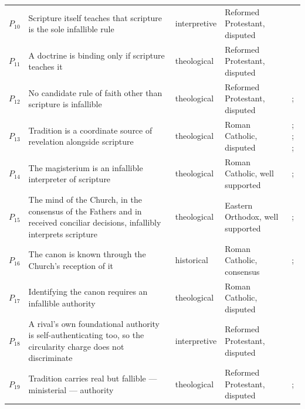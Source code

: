 \documentclass[11pt]{article}
\begin{document}
\begin{longtable}{@{}r >{\raggedright\arraybackslash}p{} l >{\raggedright\arraybackslash}p{} >{\raggedright\arraybackslash}p{}@{}}
$P_{10}$ & Scripture itself teaches that scripture is the sole infallible rule & interpretive & Reformed Protestant, disputed & \cite[I.vii.4]{calvin-institutes-1960} \\
$P_{11}$ & A doctrine is binding only if scripture teaches it & theological & Reformed Protestant, disputed & \cite[IV.x.8]{calvin-institutes-1960} \\
$P_{12}$ & No candidate rule of faith other than scripture is infallible & theological & Reformed Protestant, disputed & \cite[I.6]{westminster-confession-1647}; \cite{mathison-shape-sola-scriptura-2001} \\
$P_{13}$ & Tradition is a coordinate source of revelation alongside scripture & theological & Roman Catholic, disputed & \cite[Trent, Session IV (1546), Decree on Sacred Books and Traditions]{tanner-decrees-1990}; \cite{mathison-shape-sola-scriptura-2001}; \cite{geiselmann-meaning-of-tradition-1966}; \cite{congar-tradition-and-traditions-1966} \\
$P_{14}$ & The magisterium is an infallible interpreter of scripture & theological & Roman Catholic, well supported & \cite[Vatican I (1870), Pastor Aeternus, ch. 4]{tanner-decrees-1990}; \cite{mathison-shape-sola-scriptura-2001} \\
$P_{15}$ & The mind of the Church, in the consensus of the Fathers and in received conciliar decisions, infallibly interprets scripture & theological & Eastern Orthodox, well supported & \cite{florovsky-bible-church-tradition-1972}; \cite{ware-orthodox-church-1993} \\
$P_{16}$ & The canon is known through the Church's reception of it & historical & Roman Catholic, consensus & \cite[Augustine, Contra epistolam Manichaei 5.6]{npnf1-04-1887}; \cite[Trent, Session IV (1546), Decree on Sacred Books and Traditions]{tanner-decrees-1990} \\
$P_{17}$ & Identifying the canon requires an infallible authority & theological & Roman Catholic, disputed & \cite[Trent, Session IV (1546), Decree on Sacred Books and Traditions]{tanner-decrees-1990} \\
$P_{18}$ & A rival's own foundational authority is self-authenticating too, so the circularity charge does not discriminate & interpretive & Reformed Protestant, disputed & \cite[ch. 2]{kruger-canon-revisited-2012} \\
$P_{19}$ & Tradition carries real but fallible — ministerial — authority & theological & Reformed Protestant, disputed & \cite{mathison-shape-sola-scriptura-2001}; \cite{oberman-dawn-1986} \\

\end{longtable}
\end{document}

